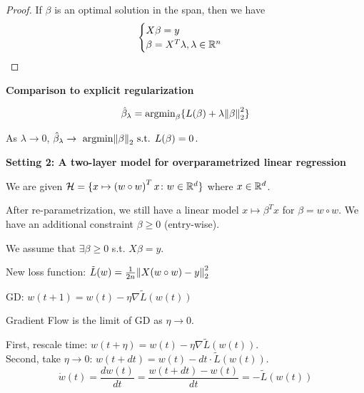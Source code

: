 \begin{proof}
    If \(\beta\) is an optimal solution in the span, then we have 
    \begin{align*}
        \begin{cases}
            X \beta = y \\ 
            \beta = X^T \lambda, \lambda \in \mathbb{R}^n 
        \end{cases} 
    \end{align*}

\end{proof}


\textbf{Comparison to explicit regularization}

\[
    \hat{\beta}_\lambda = \text{argmin}_\beta \{ L(\beta) + \lambda \norm{\beta}_2^2  \} 
\]

As \(\lambda \to 0\), \(\hat{\beta}_\lambda \to \text{ argmin} \norm{\beta}_2 \text{ s.t. } L(\beta) = 0\). 



\textbf{Setting 2: A two-layer model for overparametrized linear regression}

We are given \(\mathcal{H} = \{  x \mapsto \left( w \circ w\right)^T x \colon w \in \mathbb{R}^d  \}\) where 
\(x \in \mathbb{R}^d\). 

After re-parametrization, we still have a linear model \(x \mapsto \beta^T x\) for 
\(\beta =w \circ w\). We have an additional constraint \(\beta \geq 0\) (entry-wise). 

We assume that \(\exists \beta \geq 0\) s.t. \(X\beta = y\). 

New loss function: \(\tilde{L}(w) = \frac{1}{2n} \norm{X(w \circ w) - y}_2^2\)

GD: \( w(t+1) = w(t) - \eta \nabla \tilde{L}\left(w(t) \right)\) 

\begin{definition}
    Gradient Flow is the limit of GD as \(\eta \to 0\). 
\end{definition}

First, rescale time: \(w(t + \eta) = w(t) - \eta \nabla \tilde{L}\left( w(t) \right)\). \\ 
Second, take \(\eta \to 0\): \(w(t + dt) = w(t) - dt \cdot \tilde{L}\left( w(t) \right)\). \\ 
\[
   \dot{w} (t) =  \frac{dw(t)}{dt} = \frac{w(t + dt) - w(t)}{dt} = - \tilde{L}\left( w(t) \right)
\]


